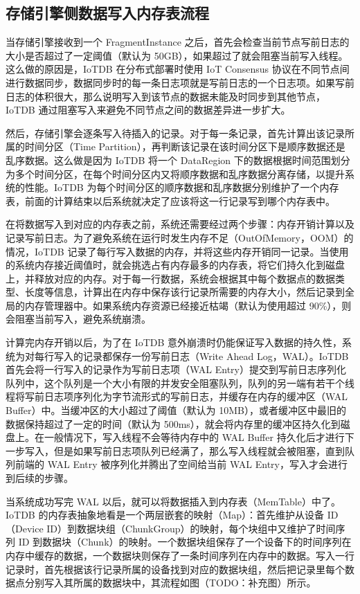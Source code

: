 \subsection{存储引擎侧数据写入内存表流程}
当存储引擎接收到一个 FragmentInstance 之后，首先会检查当前节点写前日志的大小是否超过了一定阈值（默认为 50GB），如果超过了就会阻塞当前写入线程。这么做的原因是，IoTDB 在分布式部署时使用 IoT Consensus 协议在不同节点间进行数据同步\cite{wang2023apache}，数据同步时的每一条日志项就是写前日志的一个日志项。如果写前日志的体积很大，那么说明写入到该节点的数据未能及时同步到其他节点，IoTDB 通过阻塞写入来避免不同节点之间的数据差异进一步扩大。

然后，存储引擎会逐条写入待插入的记录。对于每一条记录，首先计算出该记录所属的时间分区（Time Partition），再判断该记录在该时间分区下是顺序数据还是乱序数据。这么做是因为 IoTDB 将一个 DataRegion 下的数据根据时间范围划分为多个时间分区，在每个时间分区内又将顺序数据和乱序数据分离存储，以提升系统的性能。IoTDB 为每个时间分区的顺序数据和乱序数据分别维护了一个内存表，前面的计算结束以后系统就决定了应该将这一行记录写到哪个内存表中。

在将数据写入到对应的内存表之前，系统还需要经过两个步骤：内存开销计算以及记录写前日志。为了避免系统在运行时发生内存不足（OutOfMemory，OOM）的情况，IoTDB 记录了每行写入数据的内存，并将这些内存开销同一记录。当使用的系统内存接近阈值时，就会挑选占有内存最多的内存表，将它们持久化到磁盘上，并释放对应的内存。对于每一行数据，系统会根据其中每个数据点的数据类型、长度等信息，计算出在内存中保存该行记录所需要的内存大小，然后记录到全局的内存管理器中。如果系统内存资源已经接近枯竭（默认为使用超过 90\%），则会阻塞当前写入，避免系统崩溃。

计算完内存开销以后，为了在 IoTDB 意外崩溃时仍能保证写入数据的持久性，系统为对每行写入的记录都保存一份写前日志（Write Ahead Log，WAL）。IoTDB 首先会将一行写入的记录作为写前日志项（WAL Entry）提交到写前日志序列化队列中，这个队列是一个大小有限的并发安全阻塞队列，队列的另一端有若干个线程将写前日志项序列化为字节流形式的写前日志，并缓存在内存的缓冲区（WAL Buffer）中。当缓冲区的大小超过了阈值（默认为 10MB），或者缓冲区中最旧的数据保持超过了一定的时间（默认为 500ms），就会将内存里的缓冲区持久化到磁盘上\cite{朱海铭2023面向内存表的可动态配置预写日志框架}。在一般情况下，写入线程不会等待内存中的 WAL Buffer 持久化后才进行下一步写入，但是如果写前日志项队列已经满了，那么写入线程就会被阻塞，直到队列前端的 WAL Entry 被序列化并腾出了空间给当前 WAL Entry，写入才会进行到后续的步骤。

当系统成功写完 WAL 以后，就可以将数据插入到内存表（MemTable）中了。IoTDB 的内存表抽象地看是一个两层嵌套的映射（Map）：首先维护从设备 ID（Device ID）到数据块组（ChunkGroup）的映射，每个块组中又维护了时间序列 ID 到数据块（Chunk）的映射。一个数据块组保存了一个设备下的时间序列在内存中缓存的数据，一个数据块则保存了一条时间序列在内存中的数据。写入一行记录时，首先根据该行记录所属的设备找到对应的数据块组，然后把记录里每个数据点分别写入其所属的数据块中，其流程如图（TODO：补充图）所示。

